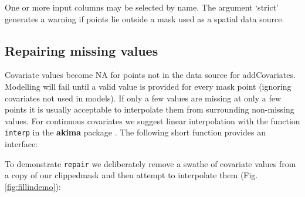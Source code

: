 \documentclass[
]{book}
\newenvironment{Shaded}{\begin{snugshade}}{\end{snugshade}}
\newcommand{\AttributeTok}[1]{\textcolor[rgb]{0.13,0.29,0.53}{#1}}
\newcommand{\ControlFlowTok}[1]{\textcolor[rgb]{0.13,0.29,0.53}{\textbf{#1}}}
\newcommand{\DecValTok}[1]{\textcolor[rgb]{0.00,0.00,0.81}{#1}}
\newcommand{\FunctionTok}[1]{\textcolor[rgb]{0.13,0.29,0.53}{\textbf{#1}}}
\newcommand{\NormalTok}[1]{#1}
\newcommand{\OtherTok}[1]{\textcolor[rgb]{0.56,0.35,0.01}{#1}}
\newcommand{\SpecialCharTok}[1]{\textcolor[rgb]{0.81,0.36,0.00}{\textbf{#1}}}
\begin{document}
One or more input columns may be selected by name. The argument `strict' generates a warning if points lie outside a mask used as a spatial data source.

\subsection{Repairing missing values}\label{repairing-missing-values}

Covariate values become NA for points not in the data source for addCovariates. Modelling will fail until a valid value is provided for every mask point (ignoring covariates not used in models). If only a few values are missing at only a few points it is usually acceptable to interpolate them from surrounding non-missing values. For continuous covariates we suggest linear interpolation with the function \texttt{interp} in the \textbf{akima} package \citep{R-akima}. The following short function provides an interface:

\begin{Shaded}
\end{Shaded}

To demonstrate \texttt{repair} we deliberately remove a swathe of covariate values from a copy of our clippedmask and then attempt to interpolate them (Fig. \ref{fig:fillindemo}):
\end{document}
